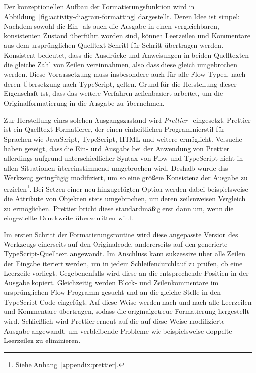 Der konzeptionellen Aufbau der Formatierungsfunktion wird in Abbildung~\ref{fig:activity-diagram-formatting} dargestellt. Deren Idee ist simpel: Nachdem sowohl die Ein- als auch die Ausgabe in einen vergleichbaren, konsistenten Zustand überführt worden sind, können Leerzeilen und Kommentare aus dem ursprünglichen Quelltext Schritt für Schritt übertragen werden. Konsistent bedeutet, dass die Ausdrücke und Anweisungen in beiden Quelltexten die gleiche Zahl von Zeilen vereinnahmen, also dass diese gleich umgebrochen werden. Diese Voraussetzung muss insbesondere auch für alle Flow-Typen, nach deren Übersetzung nach TypeScript, gelten. Grund für die Herstellung dieser Eigenschaft ist, dass das weitere Verfahren zeilenbasiert arbeitet, um die Originalformatierung in die Ausgabe zu übernehmen.

Zur Herstellung eines solchen Ausgangszustand wird \textit{Prettier}~\autocite{SOFTWARE:PRETTIER} eingesetzt. Prettier ist ein Quelltext-Formatierer, der einen einheitlichen Programmierstil für Sprachen wie JavaScript, TypeScript, HTML und weitere ermöglicht. Versuche haben gezeigt, dass die Ein- und Ausgabe bei der Anwendung von Prettier allerdings aufgrund unterschiedlicher Syntax von Flow und TypeScript nicht in allen Situationen übereinstimmend umgebrochen wird. Deshalb wurde das Werkzeug geringfügig modifiziert, um so eine größere Konsistenz der Ausgabe zu erzielen\footnote{Siehe Anhang~\ref{appendix:prettier}.}. Bei Setzen einer neu hinzugefügten Option werden dabei beispielsweise die Attribute von Objekten stets umgebrochen, um deren zeilenweisen Vergleich zu ermöglichen. Prettier bricht diese standardmäßig erst dann um, wenn die eingestellte Druckweite überschritten wird.

Im ersten Schritt der Formatierungsroutine wird diese angepasste Version des Werkzeugs einerseits auf den Originalcode, andererseits auf den generierte TypeScript-Quelltext angewandt. Im Anschluss kann sukzessive über alle Zeilen der Eingabe iteriert werden, um in jedem Schleifendurchlauf zu prüfen, ob eine Leerzeile vorliegt. Gegebenenfalls wird diese an die entsprechende Position in der Ausgabe kopiert. Gleichzeitig werden Block- und Zeilenkommentare im ursprünglichen Flow-Programm gesucht und an die gleiche Stelle in den TypeScript-Code eingefügt. Auf diese Weise werden nach und nach alle Leerzeilen und Kommentare übertragen, sodass die originalgetreue Formatierung hergestellt wird. Schließlich wird Prettier erneut auf die auf diese Weise modifizierte Ausgabe angewandt, um verbleibende Probleme wie beispielsweise doppelte Leerzeilen zu eliminieren.
